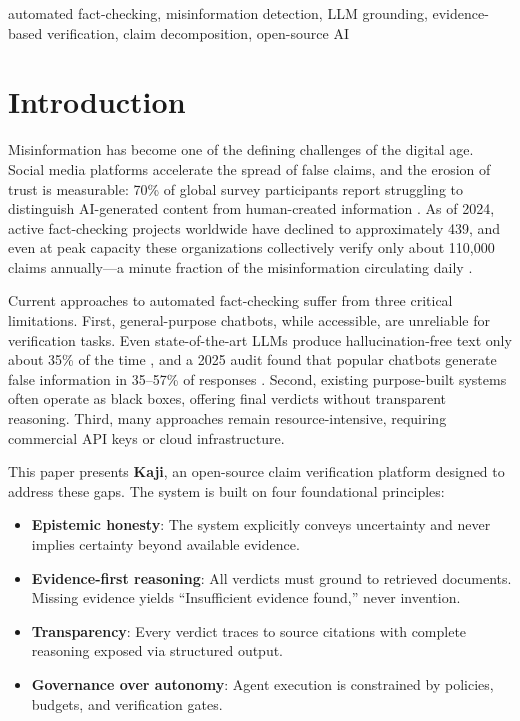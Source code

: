 \documentclass[conference]{IEEEtran}
\begin{document}
\begin{IEEEkeywords}
automated fact-checking, misinformation detection, LLM grounding, evidence-based verification, claim decomposition, open-source AI
\end{IEEEkeywords}

\section{Introduction}

Misinformation has become one of the defining challenges of the digital age. Social media platforms accelerate the spread of false claims, and the erosion of trust is measurable: 70\% of global survey participants report struggling to distinguish AI-generated content from human-created information \cite{statista2025}. As of 2024, active fact-checking projects worldwide have declined to approximately 439, and even at peak capacity these organizations collectively verify only about 110,000 claims annually---a minute fraction of the misinformation circulating daily \cite{reporterslab2025}.

Current approaches to automated fact-checking suffer from three critical limitations. First, general-purpose chatbots, while accessible, are unreliable for verification tasks. Even state-of-the-art LLMs produce hallucination-free text only about 35\% of the time \cite{zhao2024}, and a 2025 audit found that popular chatbots generate false information in 35--57\% of responses \cite{newsguard2025}. Second, existing purpose-built systems often operate as black boxes, offering final verdicts without transparent reasoning. Third, many approaches remain resource-intensive, requiring commercial API keys or cloud infrastructure.

This paper presents \textbf{Kaji}, an open-source claim verification platform designed to address these gaps. The system is built on four foundational principles:

\begin{itemize}
    \item \textbf{Epistemic honesty}: The system explicitly conveys uncertainty and never implies certainty beyond available evidence.
    \item \textbf{Evidence-first reasoning}: All verdicts must ground to retrieved documents. Missing evidence yields ``Insufficient evidence found,'' never invention.
    \item \textbf{Transparency}: Every verdict traces to source citations with complete reasoning exposed via structured output.
    \item \textbf{Governance over autonomy}: Agent execution is constrained by policies, budgets, and verification gates.
\end{itemize}
\end{document}
